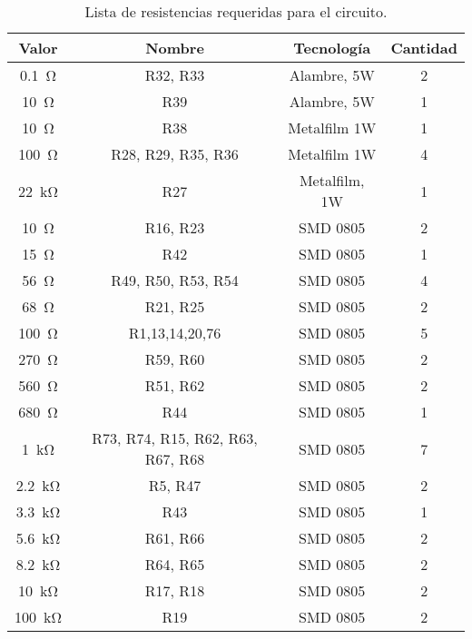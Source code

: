 \begin{table}[h!]
	\centering
	\begin{tabular}{cccc}
		\toprule
		Valor & Nombre & Tecnología & Cantidad \\
		\midrule
		\SI{0.1}{\ohm} & R32, R33 & Alambre, 5W & 2 \\
		\SI{10}{\ohm} & R39 & Alambre, 5W & 1 \\		
		\SI{10}{\ohm} & R38 & Metalfilm 1W & 1 \\
		\SI{100}{\ohm} & R28, R29, R35, R36 & Metalfilm 1W & 4 \\
		\SI{22}{\kilo\ohm} & R27 & Metalfilm, 1W & 1 \\
		\SI{10}{\ohm} & R16, R23 & SMD 0805 & 2 \\
		\SI{15}{\ohm} & R42 & SMD 0805 & 1 \\
		\SI{56}{\ohm} & R49, R50, R53, R54 & SMD 0805 & 4 \\
		\SI{68}{\ohm} & R21, R25 & SMD 0805 & 2 \\
		\SI{100}{\ohm} & R1,13,14,20,76 & SMD 0805 & 5 \\
		\SI{270}{\ohm} & R59, R60 & SMD 0805 & 2 \\ 
		\SI{560}{\ohm} & R51, R62 & SMD 0805 & 2 \\
		\SI{680}{\ohm} & R44 & SMD 0805 & 1\\
		\SI{1}{\kilo\ohm} & R73, R74, R15, R62, R63, R67, R68  & SMD 0805 & 7 \\
		\SI{2.2}{\kilo\ohm} & R5, R47 & SMD 0805 & 2 \\ 
		\SI{3.3}{\kilo\ohm} & R43 & SMD 0805 & 1 \\
		\SI{5.6}{\kilo\ohm} & R61, R66 & SMD 0805 & 2 \\
		\SI{8.2}{\kilo\ohm} & R64, R65 & SMD 0805 & 2 \\
		\SI{10}{\kilo\ohm} & R17, R18 & SMD 0805 & 2 \\
		\SI{100}{\kilo\ohm} & R19 & SMD 0805 & 2 \\
		\bottomrule
	\end{tabular}
	\caption{Lista de resistencias requeridas para el circuito.}
	\label{tab:lst_resist}
\end{table}
